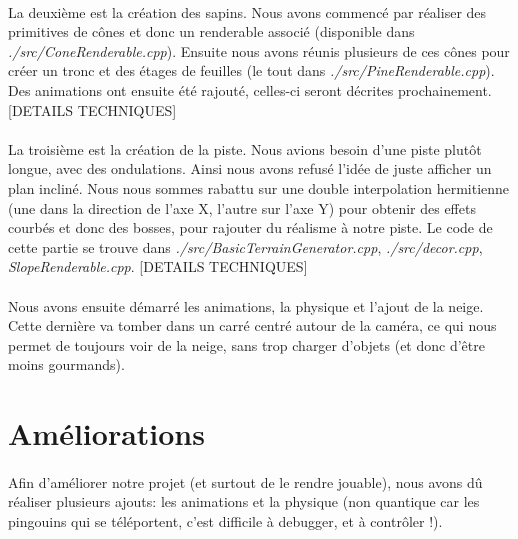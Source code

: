 \documentclass[11pt]{article}
\begin{document}
    \paragraph{}
    La deuxième est la création des sapins.
    Nous avons commencé par réaliser des primitives de cônes et donc un renderable associé (disponible dans \textit{./src/ConeRenderable.cpp}).
    Ensuite nous avons réunis plusieurs de ces cônes pour créer un tronc et des étages de feuilles (le tout dans \textit{./src/PineRenderable.cpp}).
    Des animations ont ensuite été rajouté, celles-ci seront décrites prochainement.
    [DETAILS TECHNIQUES]

    \paragraph{}
    La troisième est la création de la piste.
    Nous avions besoin d'une piste plutôt longue, avec des ondulations. Ainsi nous avons refusé l'idée de juste afficher un plan incliné.
    Nous nous sommes rabattu sur une double interpolation hermitienne (une dans la direction de l'axe X, l'autre sur l'axe Y) pour obtenir des effets courbés et donc des bosses, pour rajouter du réalisme à notre piste.
    Le code de cette partie se trouve dans \textit{./src/BasicTerrainGenerator.cpp}, \textit{./src/decor.cpp}, \textit{SlopeRenderable.cpp}.
    [DETAILS TECHNIQUES]

    \paragraph{}
    Nous avons ensuite démarré les animations, la physique et l'ajout de la neige.
    Cette dernière va tomber dans un carré centré autour de la caméra, ce qui nous permet de toujours voir de la neige, sans trop charger d'objets (et donc d'être moins gourmands).

    \newpage
    \section{Améliorations}

    \paragraph{}
    Afin d'améliorer notre projet (et surtout de le rendre jouable), nous avons dû réaliser plusieurs ajouts: les animations et la physique (non quantique car les pingouins qui se téléportent, c'est difficile à debugger, et à contrôler !).
\end{document}
